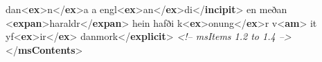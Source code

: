\begin{shaded}
\hspace*{1em}\hspace*{1em}dan{<\textbf{ex}>}n{</\textbf{ex}>}a a engl{<\textbf{ex}>}an{</\textbf{ex}>}di{</\textbf{incipit}>}\mbox{}\newline 
\hspace*{1em}\hspace*{1em}en meðan {<\textbf{expan}>}haraldr{</\textbf{expan}>} hein hafði\mbox{}\newline 
\hspace*{1em}\hspace*{1em}\hspace*{1em}\hspace*{1em}\hspace*{1em}\hspace*{1em} k{<\textbf{ex}>}onung{</\textbf{ex}>}r v{<\textbf{am}>}\mbox{}\newline 
\hspace*{1em}\hspace*{1em}\hspace*{1em}\hspace*{1em}\mbox{}\newline 
\hspace*{1em}\hspace*{1em}\hspace*{1em}it\mbox{}\newline 
\hspace*{1em}\hspace*{1em}\hspace*{1em}\hspace*{1em}\hspace*{1em}\hspace*{1em} yf{<\textbf{ex}>}ir{</\textbf{ex}>} danmork{</\textbf{explicit}>}\mbox{}\newline 
\hspace*{1em}\mbox{}\newline 
\textit{<!-- msItems 1.2 to 1.4 -->}\mbox{}\newline 
{}\mbox{}\newline 
{</\textbf{msContents}>}\end{shaded}\egroup\par \par
